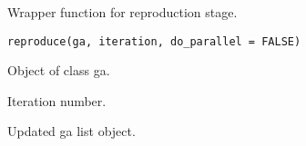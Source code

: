 %
\begin{Description}\relax
Wrapper function for reproduction stage.
\end{Description}
%
\begin{Usage}
\begin{verbatim}
reproduce(ga, iteration, do_parallel = FALSE)
\end{verbatim}
\end{Usage}
%
\begin{Arguments}
\begin{ldescription}
\item[\code{ga}] Object of class ga.

\item[\code{iteration}] Iteration number.
\end{ldescription}
\end{Arguments}
%
\begin{Value}
Updated ga list object.
\end{Value}
